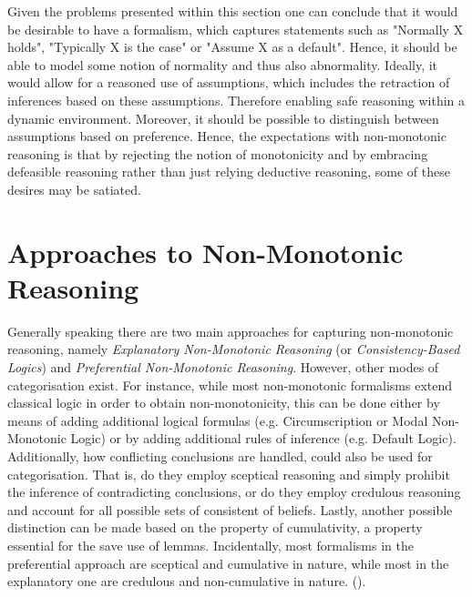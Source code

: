 \documentclass{extarticle}
\begin{document}
Given the problems presented within this section one can conclude that it would be desirable to have a formalism, which captures statements such as "Normally X holds", "Typically X is the case" or "Assume X as a default". Hence, it should be able to model some notion of normality and thus also abnormality. Ideally, it would allow for a reasoned use of assumptions, which includes the retraction of inferences based on these assumptions. Therefore enabling safe reasoning within a dynamic environment. Moreover, it should be possible to distinguish between assumptions based on preference. Hence, the expectations with non-monotonic reasoning is that by rejecting the notion of monotonicity and by embracing defeasible reasoning rather than just relying deductive reasoning, some of these desires may be satiated.


\section{Approaches to Non-Monotonic Reasoning}
Generally speaking there are two main approaches for capturing non-monotonic reasoning, namely \emph{Explanatory Non-Monotonic Reasoning}  (or \emph{Consistency-Based Logics}) and \emph{Preferential Non-Monotonic Reasoning}. However, other modes of categorisation exist. For instance, while most non-monotonic formalisms extend classical logic in order to obtain non-monotonicity, this can be done either by means of adding additional logical formulas (e.g. Circumscription or Modal Non-Monotonic Logic) or by adding additional rules of inference (e.g. Default Logic). Additionally, how conflicting conclusions are handled, could also be used for categorisation. That is, do they employ sceptical reasoning and simply prohibit the inference of contradicting conclusions, or do they employ credulous reasoning and account for all possible sets of consistent of beliefs.
Lastly, another possible distinction can be made based on the property of cumulativity, a property essential for the save use of lemmas. Incidentally, most formalisms in the preferential approach are sceptical and cumulative in nature, while most in the explanatory one are credulous and non-cumulative in nature.
(\cite{nonmonoton_stanford2018, BOCHMAN2007557, brewka1997nonmonotonic, ANTONIOU2007517}).\\
\end{document}
